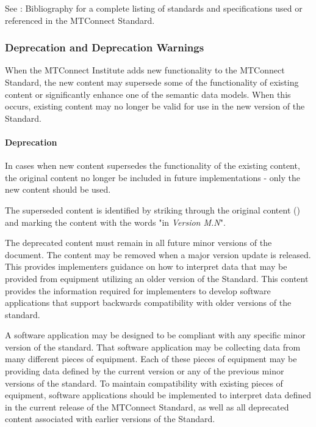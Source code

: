 \documentclass{mtconnect}	%
\begin{document}
See :  Bibliography for a complete listing of standards and specifications used or referenced in the MTConnect Standard. 

\subsubsection{Deprecation and Deprecation Warnings}

When the MTConnect Institute adds new functionality to the MTConnect Standard, the new content may supersede some of the functionality of existing content or significantly enhance one of the \glspl{semantic data model}.  When this occurs, existing content may no longer be valid for use in the new version of the Standard.

\paragraph{Deprecation}\mbox{}

In cases when new content supersedes the functionality of the existing content, the original content \MUST no longer be included in future implementations - only the new content should be used.

The superseded content is identified by striking through the original content () and marking the content with the words "\DEPRECATED in \textit{Version M.N}".

The deprecated content must remain in all future \gls{minor} versions of the document.  The content may be removed when a \gls{major} version update is released.  This provides implementers guidance on how to interpret data that may be provided from equipment utilizing an older version of the Standard.  This content provides the information required for implementers to develop software applications that support backwards compatibility with older versions of the standard.

A software application may be designed to be compliant with any specific \gls{minor} version of the standard.  That software application may be collecting data from many different pieces of equipment.  Each of these pieces of equipment may be providing data defined by the current version or any of the previous \gls{minor} versions of the standard.  To maintain compatibility with existing pieces of equipment, software applications should be implemented to interpret data defined in the current release of the MTConnect Standard, as well as all deprecated content associated with earlier versions of the Standard.
\end{document}
